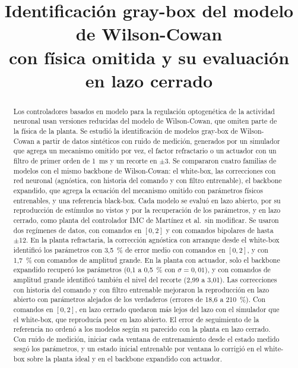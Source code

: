 \documentclass[11pt,a4paper]{article}
\title{Identificación gray-box del modelo de Wilson-Cowan\\con física omitida y su evaluación en lazo cerrado}
\author{}
\date{}
\begin{document}
\maketitle
\vspace{-14mm}

\begin{abstract}
\noindent Los controladores basados en modelo para la regulación optogenética de la actividad neuronal usan versiones reducidas del modelo de Wilson-Cowan, que omiten parte de la física de la planta. Se estudió la identificación de modelos gray-box de Wilson-Cowan a partir de datos sintéticos con ruido de medición, generados por un simulador que agrega un mecanismo omitido por vez, el factor refractario o un actuador con un filtro de primer orden de 1~ms y un recorte en $\pm 3$. Se compararon cuatro familias de modelos con el mismo backbone de Wilson-Cowan: el white-box, las correcciones con red neuronal (agnóstica, con historia del comando y con filtro entrenable), el backbone expandido, que agrega la ecuación del mecanismo omitido con parámetros físicos entrenables, y una referencia black-box. Cada modelo se evaluó en lazo abierto, por su reproducción de estímulos no vistos y por la recuperación de los parámetros, y en lazo cerrado, como planta del controlador IMC de Martínez et al.\ sin modificar. Se usaron dos regímenes de datos, con comandos en $[0, 2]$ y con comandos bipolares de hasta $\pm 12$. En la planta refractaria, la corrección agnóstica con arranque desde el white-box identificó los parámetros con 3,5~\% de error medio con comandos en $[0, 2]$, y con 1,7~\% con comandos de amplitud grande. En la planta con actuador, solo el backbone expandido recuperó los parámetros (0,1 a 0,5~\% con $\sigma = 0{,}01$), y con comandos de amplitud grande identificó también el nivel del recorte (2,99 a 3,01). Las correcciones con historia del comando y con filtro entrenable mejoraron la reproducción en lazo abierto con parámetros alejados de los verdaderos (errores de 18,6 a 210~\%). Con comandos en $[0, 2]$, en lazo cerrado quedaron más lejos del lazo con el simulador que el white-box, que reproducía peor en lazo abierto. El error de seguimiento de la referencia no ordenó a los modelos según su parecido con la planta en lazo cerrado. Con ruido de medición, iniciar cada ventana de entrenamiento desde el estado medido sesgó los parámetros, y un estado inicial entrenable por ventana lo corrigió en el white-box sobre la planta ideal y en el backbone expandido con actuador.
\end{abstract}
\end{document}
